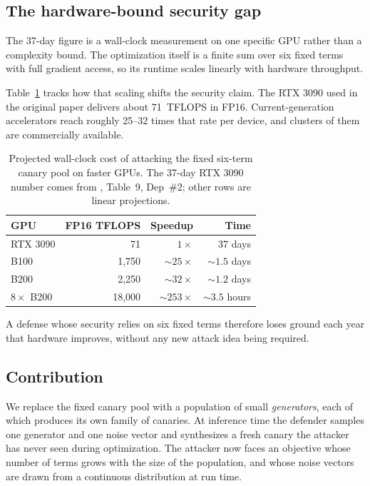 \documentclass[conference]{IEEEtran}
\begin{document}
\subsection{The hardware-bound security gap}

The 37-day figure is a wall-clock measurement on one specific GPU rather
than a complexity bound. The optimization itself is a finite sum over six
fixed terms with full gradient access, so its runtime scales linearly with
hardware throughput.

Table~\ref{tab:gpu} tracks how that scaling shifts the security claim.
The RTX 3090 used in the original paper delivers about 71~TFLOPS in FP16.
Current-generation accelerators reach roughly 25--32 times that rate per
device, and clusters of them are commercially available.

\begin{table}[!t]
\caption{Projected wall-clock cost of attacking the fixed six-term canary
pool on faster GPUs. The 37-day RTX 3090 number comes from
\cite{feng2025fff}, Table~9, Dep~\#2; other rows are linear projections.}
\label{tab:gpu}
\centering
\renewcommand{\arraystretch}{1.15}
\begin{tabular}{lrrr}
\toprule
\textbf{GPU} & \textbf{FP16 TFLOPS} & \textbf{Speedup} & \textbf{Time} \\
\midrule
RTX 3090       & 71     & $1\times$       & 37 days \\
B100           & 1{,}750  & ${\sim}25\times$ & ${\sim}1.5$ days \\
B200           & 2{,}250  & ${\sim}32\times$ & ${\sim}1.2$ days \\
$8\times$ B200 & 18{,}000 & ${\sim}253\times$& ${\sim}3.5$ hours \\
\bottomrule
\end{tabular}
\end{table}

A defense whose security relies on six fixed terms therefore loses ground
each year that hardware improves, without any new attack idea being
required.

\subsection{Contribution}

We replace the fixed canary pool with a population of small \emph{generators},
each of which produces its own family of canaries. At inference time the
defender samples one generator and one noise vector and synthesizes a fresh
canary the attacker has never seen during optimization. The attacker now
faces an objective whose number of terms grows with the size of the
population, and whose noise vectors are drawn from a continuous distribution
at run time.
\end{document}
